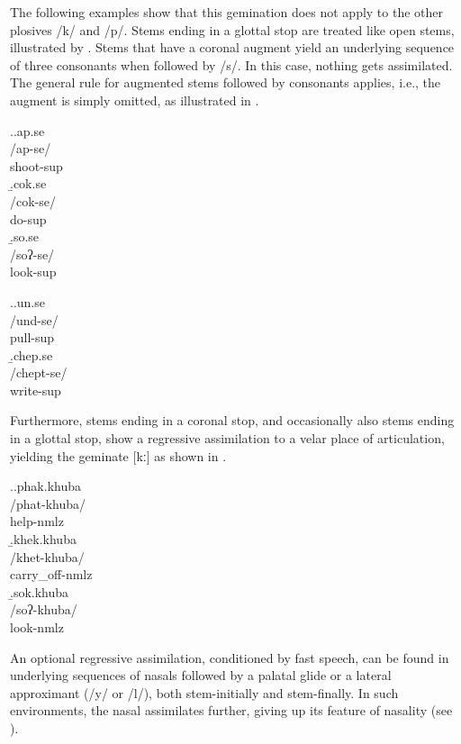 The following examples show that this gemination does not apply to the other plosives /k/ and /p/. Stems ending in a glottal stop are treated like open stems, illustrated by \Next[c].	Stems that have a coronal augment yield an underlying sequence of three consonants when followed by /s/. In this case, nothing gets assimilated. The general rule for augmented stems followed by consonants applies, i.e.,  the augment is simply omitted, as illustrated in \NNext. 
			
		\ex.\a.\glll ap.se\\
		/ap-se/\\
shoot{\sc -sup}\\
\b.\glll cok.se\\
/cok-se/\\
do{\sc -sup}\\
	\b.\glll so.se\\
/soʔ-se/\\
look{\sc -sup}\\
			
			
\ex.\a.\glll un.se\\
		/und-se/\\
		pull{\sc -sup}\\
		\b.\glll  chep.se\\	
			/chept-se/\\
			write{\sc -sup}\\
			
			
Furthermore, stems ending in a coronal stop, and occasionally also stems ending in a glottal stop, show a regressive  assimilation to a velar place of articulation, yielding the geminate [kː] as shown in \Next.
			
			\ex.\a.\glll phak.khuba\\
		/phat-khuba/\\
		help{\sc -nmlz}\\
		\b.\glll khek.khuba\\
		/khet-khuba/\\
		carry\_off{\sc -nmlz}\\
		\b.\glll sok.khuba\\
		/soʔ-khuba/\\
		look{\sc -nmlz}\\
	
	
An optional regressive assimilation, conditioned by fast speech, can be found in underlying sequences of nasals followed by a palatal glide or a lateral approximant (/y/ or /l/), both stem-initially and stem-finally. In such environments, the nasal assimilates further, giving up its feature of nasality (see \Next). 

